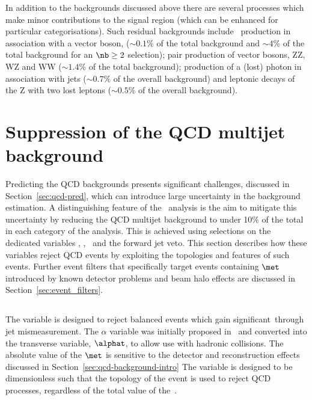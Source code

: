 In addition to the backgrounds discussed above there are several processes which 
make minor contributions to the signal region (which can be enhanced
for particular categorisations). Such residual backgrounds include \ttbar~production in association with a vector
boson, \ttV ($\sim0.1\%$ of the total background and $\sim4\%$ of the total background for an $\nb \ge 2$ selection); 
pair production of vector bosons, ZZ, WZ and WW ($\sim1.4\%$ of the total background); 
production of a (lost) photon in association with jets ($\sim0.7\%$ of the overall background) and
leptonic decays of the Z with two lost leptons ($\sim0.5\%$ of the overall background).

\section{Suppression of the QCD multijet background}
\label{sec:important-variables}

Predicting the QCD backgrounds presents significant challenges, discussed in Section~\ref{sec:qcd-pred}, which
can introduce large uncertainty in the background estimation. A distinguishing feature
of the \alphat~analysis is the aim to mitigate this uncertainty by reducing the 
QCD multijet background to under 10\% of the total in each category of the analysis. 
This is achieved using selections on the dedicated variables \alphat, \bdphi, \mhtmet~and the forward jet veto. This section
describes how these variables reject QCD events by exploiting the topologies and features of such events. Further
event filters that specifically target events containing $\met$ introduced by
known detector problems and beam halo effects are discussed in Section~\ref{sec:event_filters}.

\subsection{\alphat}
The \alphat variable is designed to reject balanced events which gain significant~\met through
jet mismeasurement. The $\alpha$ variable was initially proposed in~\cite{Randall} and
converted into the transverse variable, $\alphat$, to allow use with hadronic collisions. The absolute
value of the $\met$ is sensitive to the detector and reconstruction effects discussed in Section~\ref{sec:qcd-background-intro} 
The \alphat variable is designed to be dimensionless such that the topology of the event is used to reject 
QCD processes, regardless of the total value of the~\met.

